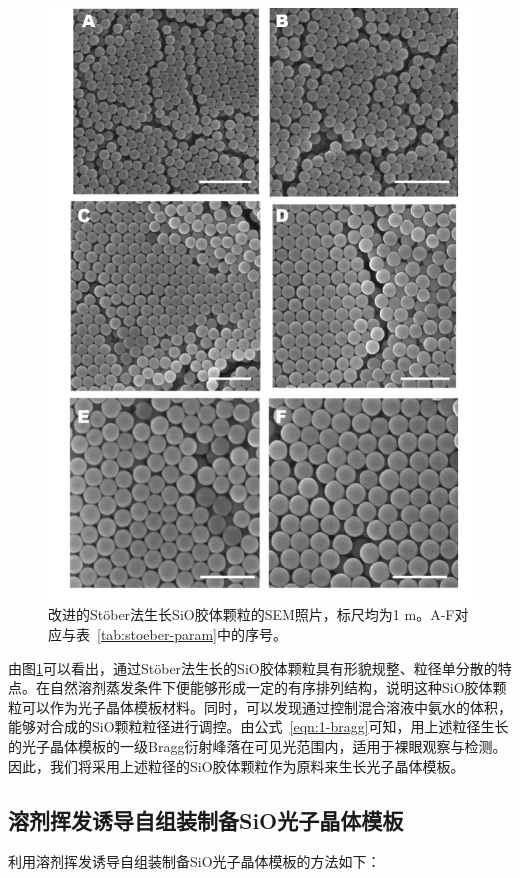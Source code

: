 \begin{figure}[htbp]
	\centering
	\includegraphics[width=0.8\linewidth]{figures/SEM-stober.png}
	\caption{改进的Stöber法生长SiO胶体颗粒的SEM照片，标尺均为1 \text{$\mu$}m。A-F对应与表~\ref{tab:stoeber-param}中的序号。}
	\label{fig:stober_size}
\end{figure}

由图\ref{fig:stober_size}可以看出，通过Stöber法生长的SiO胶体颗粒具有形貌规整、粒径单分散的特点。在自然溶剂蒸发条件下便能够形成一定的有序排列结构，说明这种SiO胶体颗粒可以作为光子晶体模板材料。同时，可以发现通过控制混合溶液中氨水的体积，能够对合成的SiO颗粒粒径进行调控。由公式~\ref{eqn:1-bragg}可知，用上述粒径生长的光子晶体模板的一级Bragg衍射峰落在可见光范围内，适用于裸眼观察与检测。因此，我们将采用上述粒径的SiO胶体颗粒作为原料来生长光子晶体模板。

\subsection{溶剂挥发诱导自组装制备SiO光子晶体模板}
\label{subsec:evap-template}

利用溶剂挥发诱导自组装制备SiO光子晶体模板的方法如下：

